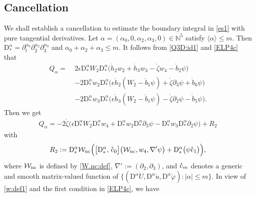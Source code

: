 \documentclass[twoside,11pt]{article}
\numberwithin{equation}{section}
\def\p{\partial}
\begin{document}
	\subsection{Cancellation} \label{sec:cancel}
We shall establish a cancellation to estimate the boundary integral in \eqref{es1} with pure tangential derivatives.
Let $\alpha=(\alpha_0,0,\alpha_2,\alpha_3,0)\in\mathbb{N}^5$
satisfy $\langle \alpha \rangle  \leq m$.
Then $\mathrm{D}_*^{\alpha}=\p_t^{\alpha_0}\p_2^{\alpha_2}\p_3^{\alpha_3}$ and $\alpha_0+\alpha_2+\alpha_3\leq m$. It follows from \eqref{Q3D:id1} and \eqref{ELP4c} that
\begin{align}\nonumber
	{Q}_{\alpha}
	=\; &
	2\epsilon \mathrm{D}_*^{\alpha}W_2\mathrm{D}_*^{\alpha}\Big(
	\mathring{{h}}_2 w_2+\mathring{{h}}_3 w_3-\mathring{\zeta} w_4
	-\mathring{b}_2 \psi
	\Big)\nonumber\\[0.5mm]
 &
-2 \mathrm{D}_*^{\alpha}w_2\mathrm{D}_*^{\alpha}\Big(
\epsilon \mathring{h}_2 (W_2-\mathring{b}_1\psi) +\mathring{\zeta} \p_3\psi
+\mathring{b}_6\psi
\Big)\nonumber
\\[0.5mm]
	&-2\mathrm{D}_*^{\alpha}w_3\mathrm{D}_*^{\alpha}\Big(
	\epsilon \mathring{h}_3 (W_2-\mathring{b}_1\psi)
	-\mathring{\zeta} \p_2\psi
	-\mathring{b}_5 \psi
	\Big).\nonumber
\end{align}
Then we get
	\begin{align}  \label{Q3D:id2}
		{Q}_{\alpha}
		=
		-2 \mathring{\zeta}  \Big(
\epsilon \mathrm{D}_*^{\alpha}W_2\mathrm{D}_*^{\alpha} w_4
+\mathrm{D}_*^{\alpha}w_2 \mathrm{D}_*^{\alpha}  \p_3\psi
-\mathrm{D}_*^{\alpha}w_3\mathrm{D}_*^{\alpha} \p_2\psi
\Big)+R_2
	\end{align}
with
\begin{align}
R_2:=
	\mathrm{D}_*^{\alpha} \mathcal{W}_{\rm nc}
	\Big(\big[\mathrm{D}_*^{\alpha},\,\mathring{\rm c}_0\big]
	\big(\mathcal{W}_{\rm nc},w_4, \nabla'\psi\big)
	+\mathrm{D}_*^{\alpha}\big(\psi \mathring{\rm c}_1\big)
	\Big), \nonumber
\end{align}
where
$\mathcal{W}_{\rm nc}$ is defined by \eqref{W.nc:def},
$\nabla':=(\p_2,\p_3)$,
and $\mathring{\rm c}_m$ denotes a generic and smooth matrix-valued function of
$\{(\mathrm{D}^{\alpha} \mathring{U},\mathrm{D}^{\alpha} \mathring{{u}},\mathrm{D}^{\alpha}\mathring{\varphi}): |\alpha|\leq m\}$.
In view of \eqref{w:def1} and the first condition in \eqref{ELP4c}, we have
\end{document}
